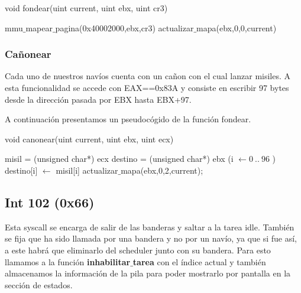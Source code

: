\begin{algorithm}[h!]
\caption{void fondear(uint current, uint ebx, uint cr3)}
\begin{algorithmic}
	\State mmu$\_$mapear$\_$pagina(0x40002000,ebx,cr3)
	\State actualizar$\_$mapa(ebx,0,0,current)
\end{algorithmic}
\end{algorithm}
\subsubsection{Cañonear}
\par{Cada uno de nuestros navíos cuenta con un cañon con el cual lanzar misiles. A esta funcionalidad se accede con EAX==0x83A y consiste en escribir 97 bytes desde la dirección pasada por EBX hasta EBX+97.}
\par{A continuación presentamos un pseudocógido de la función fondear.}

\begin{algorithm}[h!]
\caption{void canonear(uint current, uint ebx, uint ecx)}
\begin{algorithmic}
	\State misil = (unsigned char*) ecx
	\State destino = (unsigned char*) ebx
	\For (i $\gets 0~..~96$ )
	\State destino[i] $\gets$ misil[i]
	\EndFor
	\State actualizar$\_$mapa(ebx,0,2,current);
\end{algorithmic}
\end{algorithm}


	
\subsection{Int 102 (0x66)}
\par{Esta syscall se encarga de salir de las banderas y saltar a la tarea idle. También se fija que ha sido llamada por una bandera y no por un navío, ya que si fue así, a este habrá que eliminarlo del scheduler junto con su bandera. Para esto llamamos a la función \textbf{inhabilitar$\_$tarea} con el índice actual y también almacenamos la información de la pila para poder mostrarlo por pantalla en la sección de estados.}